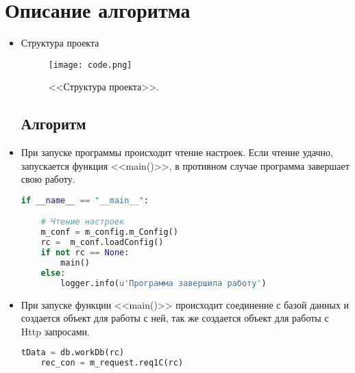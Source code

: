\section{Описание алгоритма}

\begin{itemize}
	
\item Структура проекта

\begin{figure}[H]
	\texttt{[image: code.png]}
	\caption{<<Структура проекта>>.}
	\label{ris:code.png}
\end{figure}

\subsection{Алгоритм}
\item При запуске программы происходит чтение настроек. Если чтение удачно, запускается функция <<main()>>, в противном случае программа завершает свою работу.



\begin{tcolorbox}
	\begin{lstlisting}[language=Python,ndkeywordstyle=\color{darkgray}\bfseries,identifierstyle=\color{black},stringstyle=\color{red}\ttfamily,showstringspaces=false,keepspaces=true,extendedchars=\true]
if __name__ == "__main__":

	# Чтение настроек
	m_conf = m_config.m_Config()   
	rc =  m_conf.loadConfig()
	if not rc == None:
		main()
	else:
		logger.info(u'Программа завершила работу') 
	\end{lstlisting}
\end{tcolorbox}

\par

\item При запуске функции <<main()>> происходит соединение с базой данных и создается объект для работы с ней, так же создается объект для работы с Http запросами.

\begin{tcolorbox}
	\begin{lstlisting}[language=Python,ndkeywordstyle=\color{darkgray}\bfseries,identifierstyle=\color{black},stringstyle=\color{red}\ttfamily,showstringspaces=false,keepspaces=true,extendedchars=\true]
    tData = db.workDb(rc)
	rec_con = m_request.req1C(rc)
	\end{lstlisting}
\end{tcolorbox}



\end{itemize}
